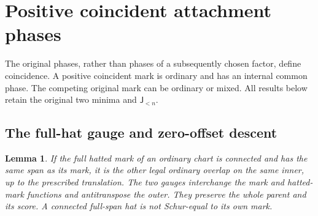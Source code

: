 \documentclass[11pt,a4paper]{amsart}
\numberwithin{equation}{section}
\theoremstyle{plain}
\newtheorem{lemma}[theorem]{Lemma}
\theoremstyle{definition}
\newcommand{\Jlower}{\mathsf J_{<n}}
\begin{document}
\section{Positive coincident attachment phases}\label{app:coincident}

The original phases, rather than phases of a subsequently chosen factor,
define coincidence.  A positive coincident mark is ordinary and has an
internal common phase.  The competing original mark can be ordinary or
mixed.  All results below retain the original two minima and \(\Jlower\).

\subsection{The full-hat gauge and zero-offset descent}

\begin{lemma}\label{lem:hat-dual}
If the full hatted mark of an ordinary chart is connected and has the
same span as its mark, it is the other legal ordinary overlap on the same
inner, up to the prescribed translation.  The two gauges interchange the
mark and hatted-mark functions and antitranspose the outer.  They preserve
the whole parent and its score.  A connected full-span hat is not
Schur-equal to its own mark.
\end{lemma}
\end{document}
